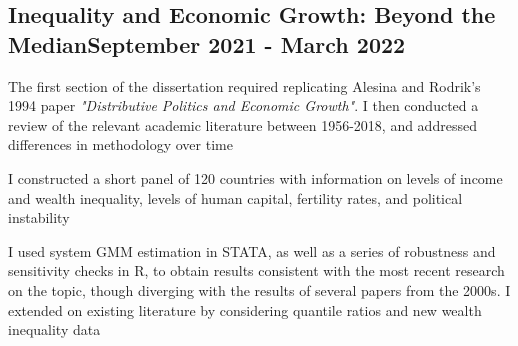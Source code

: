 \documentclass[a4paper, 12pt]{article}
\begin{document}
\subsection {{Inequality and Economic Growth: Beyond the Median}\hfill September 2021 - March 2022}
\begin{zitemize}

\item The first section of the dissertation required replicating Alesina and Rodrik’s 1994 paper \emph{"Distributive Politics and Economic Growth"}. I then conducted a review of the relevant academic literature between 1956-2018, and addressed differences in methodology over time
\item I constructed a short panel of 120 countries with information on levels of income and wealth inequality, levels of human capital, fertility rates, and political instability
\item I used system GMM estimation in STATA, as well as a series of robustness and sensitivity checks in R, to obtain results consistent with the most recent research on the topic, though diverging with the results of several papers from the 2000s. I extended on existing literature by considering quantile ratios and new wealth inequality data
\end{zitemize}
\end{document}

